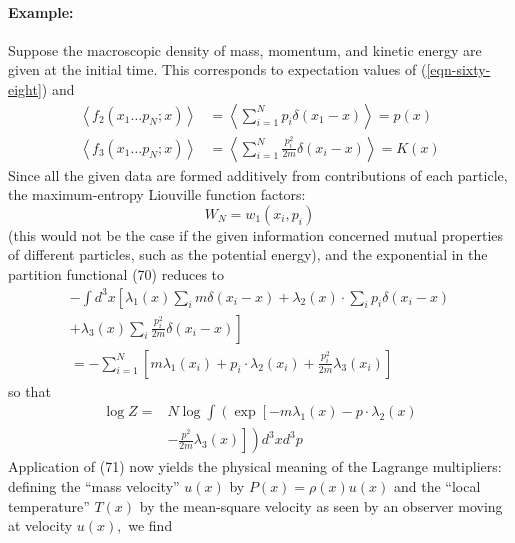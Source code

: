 \documentclass[]{article}
\begin{document}
\paragraph{Example:} Suppose the macroscopic density of mass, momentum, and kinetic energy are given at the initial time. This corresponds to expectation values of (\ref{eqn-sixty-eight}) and
\begin{align}
\left\langle f_{2}\left(x_{1} \ldots p_{N} ; x\right)\right\rangle & =\left\langle\sum_{i=1}^{N} p_{i} \delta\left(x_{1}-x\right)\right\rangle=p(x) \\
\left\langle f_{3}\left(x_{1} \ldots p_{N} ; x\right)\right\rangle & =\left\langle\sum_{i=1}^{N} \frac{p_{i}^{2}}{2 m} \delta\left(x_{i}-x\right)\right\rangle=K(x)
\end{align}
Since all the given data are formed additively from contributions of each particle, the maximum-entropy Liouville function factors:
\begin{equation}
W_{N}=w_{1}\left(x_{i}, p_{i}\right)
\end{equation}
(this would not be the case if the given information concerned mutual properties of different particles, such as the potential energy), and the exponential in the partition functional (70) reduces to
\begin{align*}
-\int d ^{3} x \left[\lambda_{1}( x ) \sum_{ i } m \delta\left( x _{ i }- x \right)+\lambda_{2}( x ) \cdot \sum_{ i } p _{ i } \delta\left( x _{ i }- x \right)\right. \\
\left.+\lambda_{3}( x ) \sum_{ i } \frac{ p _{ i }^{2}}{2 m } \delta\left( x _{ i }- x \right)\right] \\
=-\sum_{ i =1}^{ N }\left[ m \lambda_{1}\left( x _{ i }\right)+ p _{ i } \cdot \lambda_{2}\left( x _{ i }\right)+\frac{ p _{ i }^{2}}{2 m } \lambda_{3}\left( x _{ i }\right)\right]
\end{align*}
so that
\begin{equation}
\begin{aligned}
\log Z=& N \log \int\left(\exp \left[-m \lambda_{1}(x)-p \cdot \lambda_{2}(x)\right.\right.\\
&\left.\left.-\frac{p^{2}}{2 m} \lambda_{3}(x)\right]\right) d^{3} x d^{3} p
\end{aligned}
\end{equation}
Application of (71) now yields the physical meaning of the Lagrange multipliers: defining the ``mass velocity'' $u ( x )$ by $P ( x )=\rho( x ) u ( x )$
and the ``local temperature'' $T ( x )$ by the mean-square velocity as seen by an observer moving at velocity $u ( x ),$ we find
\end{document}
